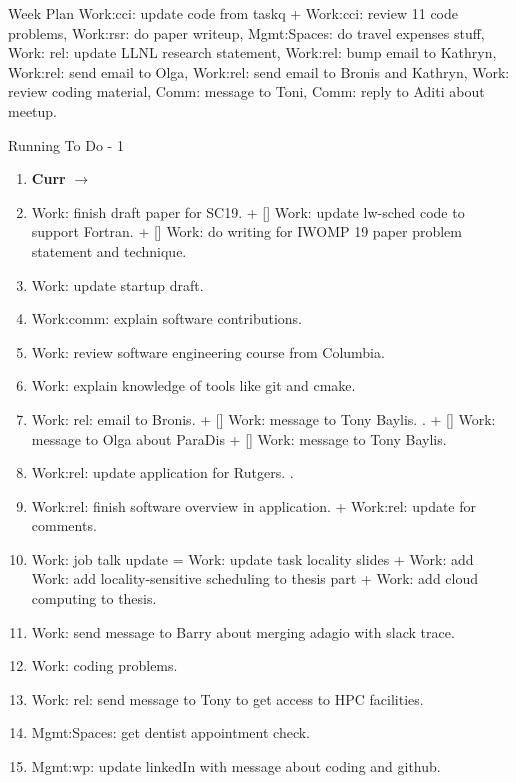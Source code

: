 
\begin{frame}{Week Plan} 
Work:cci: update code from taskq + Work:cci: review 11 code problems, Work:rsr: do paper writeup, Mgmt:Spaces: do travel expenses stuff, Work: rel: update LLNL research statement, Work:rel: bump email to Kathryn, Work:rel: send email to Olga, Work:rel: send email to Bronis and Kathryn, Work: review coding material, Comm: message to Toni, Comm: reply to Aditi about meetup. 
\end{frame} 
\begin{frame}{Running To Do - 1}
\begin{enumerate}
\item \textbf{Curr} $\rightarrow$
 \item Work: finish draft paper for SC19.  + [] Work: update lw-sched code to support Fortran.  + [] Work: do writing for IWOMP 19 paper problem statement and technique.
 \item Work: update startup draft.  
 \item Work:comm: explain software contributions.
 \item Work: review software engineering course from Columbia.
 \item Work: explain knowledge of tools like git and cmake. 
 \item Work: rel: email to Bronis. +  [] Work: message to Tony Baylis. . + [] Work: message to Olga about ParaDis + [] Work: message to Tony Baylis. 
\item Work:rel: update application for Rutgers. . 
\item Work:rel: finish software overview in application.  + Work:rel: update for comments. 
\item Work: job talk update = Work: update task locality slides +  Work: add Work: add locality-sensitive scheduling to thesis part + Work: add cloud computing to thesis. 
\item Work: send message to Barry about merging adagio with slack trace.
\item Work: coding problems. 
\item Work: rel: send message to Tony to get access to HPC facilities. 
\item Mgmt:Spaces: get dentist appointment check. 
\item Mgmt:wp: update linkedIn with message about coding and github.
\seti 
\end{enumerate}
\end{frame}
 
